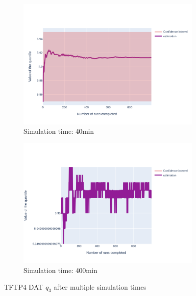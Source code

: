 \documentclass{article}
\begin{document}
\begin{figure}[H]
\begin{subfigure}{.495\textwidth}
    \end{subfigure}
    \begin{subfigure}{.495\textwidth}
        \centering
        \includegraphics[width=\textwidth]{../fig/quantile3/TFTP4 DAT_40mn.png}
        \caption{Simulation time: 40min}
    \end{subfigure}
    \begin{subfigure}{.495\textwidth}
        \centering
        \includegraphics[width=\textwidth]{../fig/quantile3/TFTP4 DAT_400mn.png}
        \caption{Simulation time: 400min}
        \label{fig: TFTP4 DAT q3 400 min}
    \end{subfigure}
    \caption{TFTP4 DAT $q_3$ after multiple simulation times}
\end{figure}
\end{document}
